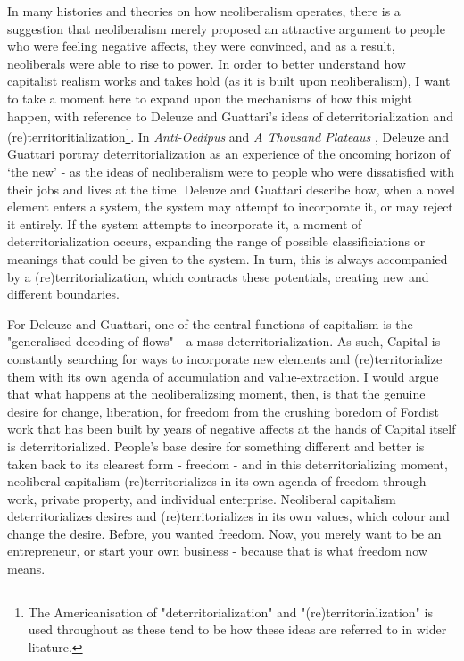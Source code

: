 In many histories and theories on how neoliberalism operates, there is a suggestion that neoliberalism merely proposed an attractive argument to people who were feeling negative affects, they were convinced, and as a result, neoliberals were able to rise to power. In order to better understand how capitalist realism works and takes hold (as it is built upon neoliberalism), I want to take a moment here to  expand upon the mechanisms of how this might happen,  with reference to Deleuze and Guattari's ideas of deterritorialization and (re)territoritialization\footnote{The Americanisation of "deterritorialization" and "(re)territorialization" is used throughout as these tend to be how these ideas are referred to in wider litature.}. In \textit{Anti-Oedipus} \citeyearpar{deleuze_anti-oedipus:_1983} and \emph{A Thousand Plateaus} \citeyearpar{deleuze_thousand_1987}, Deleuze and Guattari portray deterritorialization as an experience of the oncoming horizon of `the new' - as the ideas of neoliberalism were to people who were dissatisfied with their jobs and lives at the time. Deleuze and Guattari describe how, when a novel element enters a system, the system may attempt to incorporate it, or may reject it entirely. If the system attempts to incorporate it, a moment of deterritorialization occurs, expanding the range of possible classificiations or meanings that could be given to the system. In turn, this is always accompanied by a (re)territorialization, which contracts these potentials, creating new and different boundaries. 

For Deleuze and Guattari, one of the central functions of capitalism is the "generalised decoding of flows" \citep[p. 153]{deleuze_anti-oedipus:_1983} - a mass deterritorialization. As such, Capital is constantly searching for ways to incorporate new elements and (re)territorialize them with its own agenda of accumulation and value-extraction. I would argue that what happens at the neoliberalizsing moment, then, is that the genuine desire for change, liberation, for freedom from the crushing boredom of Fordist work that has been built by years of negative affects at the hands of Capital itself is deterritorialized. People's base desire for something different and better is taken back to its clearest form - freedom - and in this deterritorializing moment, neoliberal capitalism (re)territorializes in its own agenda of freedom through work, private property, and individual enterprise. Neoliberal capitalism deterritorializes desires and (re)territorializes in its own values, which colour and change the desire. Before, you wanted freedom. Now, you merely want to be an entrepreneur, or start your own business - because that is what freedom now means.

